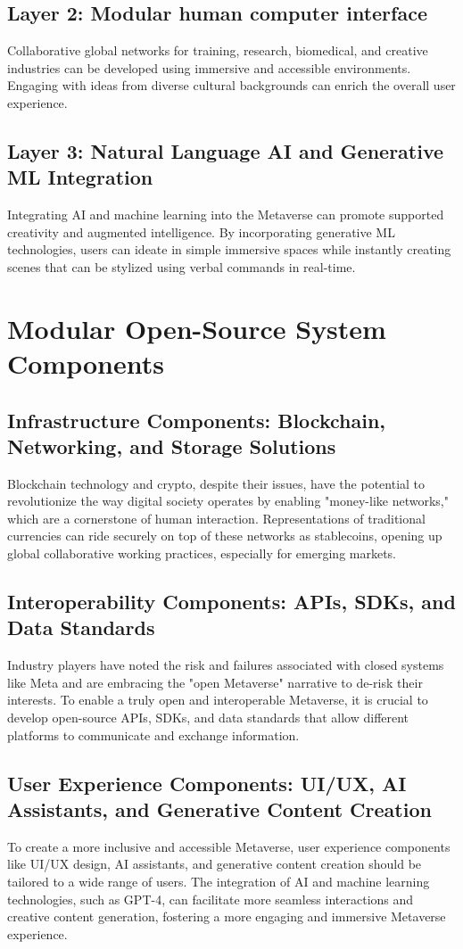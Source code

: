 \subsection{Layer 2: Modular human computer interface}
Collaborative global networks for training, research, biomedical, and creative industries can be developed using immersive and accessible environments. Engaging with ideas from diverse cultural backgrounds can enrich the overall user experience.
\subsection{Layer 3: Natural Language AI and Generative ML Integration}
Integrating AI and machine learning into the Metaverse can promote supported creativity and augmented intelligence. By incorporating generative ML technologies, users can ideate in simple immersive spaces while instantly creating scenes that can be stylized using verbal commands in real-time.
\section{Modular Open-Source System Components}
\subsection{Infrastructure Components: Blockchain, Networking, and Storage Solutions}
Blockchain technology and crypto, despite their issues, have the potential to revolutionize the way digital society operates by enabling "money-like networks," which are a cornerstone of human interaction. Representations of traditional currencies can ride securely on top of these networks as stablecoins, opening up global collaborative working practices, especially for emerging markets.

\subsection{Interoperability Components: APIs, SDKs, and Data Standards}
Industry players have noted the risk and failures associated with closed systems like Meta and are embracing the "open Metaverse" narrative to de-risk their interests. To enable a truly open and interoperable Metaverse, it is crucial to develop open-source APIs, SDKs, and data standards that allow different platforms to communicate and exchange information.

\subsection{User Experience Components: UI/UX, AI Assistants, and Generative Content Creation}
To create a more inclusive and accessible Metaverse, user experience components like UI/UX design, AI assistants, and generative content creation should be tailored to a wide range of users. The integration of AI and machine learning technologies, such as GPT-4, can facilitate more seamless interactions and creative content generation, fostering a more engaging and immersive Metaverse experience.

